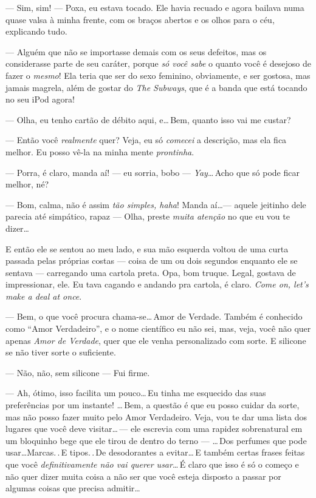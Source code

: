 --- Sim, sim! --- Poxa, eu estava tocado. Ele havia recuado e agora bailava numa quase valsa à minha frente, com os braços abertos e os olhos para o céu, explicando tudo.

--- Alguém que não se importasse demais com os seus defeitos, mas os considerasse parte de seu caráter, porque \emph{só você sabe} o quanto você é desejoso de fazer o \emph{mesmo}! Ela teria que ser do sexo feminino, obviamente, e ser gostosa, mas jamais magrela, além de gostar do \emph{The Subways}, que é a banda que está tocando no seu iPod agora!

--- Olha, eu tenho cartão de débito aqui, e\ldots\,Bem, quanto isso vai me custar?

--- Então você \emph{realmente} quer? Veja, eu só \emph{comecei} a descrição, mas ela fica melhor. Eu posso vê-la na minha mente \emph{prontinha}.

--- Porra, é claro, manda aí! --- eu sorria, bobo --- \emph{Yay}\ldots\,Acho que só pode ficar melhor, né?

--- Bom, calma, não é assim \emph{tão simples, haha}! Manda aí\ldots --- aquele jeitinho dele parecia até simpático, rapaz --- Olha, preste \emph{muita atenção} no que eu vou te dizer\ldots

E então ele se sentou ao meu lado, e sua mão esquerda voltou de uma curta passada pelas próprias costas --- coisa de um ou dois segundos enquanto ele se sentava --- carregando uma cartola preta. Opa, bom truque. Legal, gostava de impressionar, ele. Eu tava cagando e andando pra cartola, é claro. \foreignlanguage{english}{\emph{Come on, let's make a deal at once}}.

--- Bem, o que você procura chama-se\ldots\,Amor de Verdade. Também é conhecido como ``Amor Verdadeiro'', e o nome científico eu não sei, mas, veja, você não quer apenas \emph{Amor de Verdade}, quer que ele venha personalizado com sorte. E silicone se não tiver sorte o suficiente.

--- Não, não, sem silicone --- Fui firme.

--- Ah, ótimo, isso facilita um pouco\ldots\,Eu tinha me esquecido das suas preferências por um instante! \ldots\,Bem, a questão é que eu posso cuidar da sorte, mas não posso fazer muito pelo Amor Verdadeiro. Veja, vou te dar uma lista dos lugares que você deve visitar\ldots\,--- ele escrevia com uma rapidez sobrenatural em um bloquinho bege que ele tirou de dentro do terno ---  \ldots\,Dos perfumes que pode usar\ldots Marcas.\,.\,E tipos.\,.\,De desodorantes a evitar\ldots\,E também certas frases feitas que você \emph{definitivamente não vai querer usar}\ldots\,É claro que isso é só o começo e não quer dizer muita coisa a não ser que você esteja disposto a passar por algumas coisas que precisa admitir\ldots

